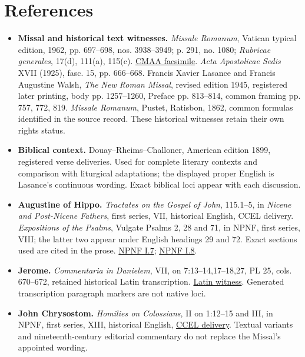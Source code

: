 \section{References}
\begin{itemize}[leftmargin=1.2em,itemsep=.55em]
\item \textbf{Missal and historical text witnesses.}
\emph{Missale Romanum}, Vatican typical edition, 1962, pp. 697--698, nos. 3938--3949; p. 291, no. 1080; \emph{Rubricae generales}, 17(d), 111(a), 115(c). \href{https://media.churchmusicassociation.org/pdf/missale62.pdf}{CMAA facsimile}. \emph{Acta Apostolicae Sedis} XVII (1925), fasc. 15, pp. 666--668. Francis Xavier Lasance and Francis Augustine Walsh, \emph{The New Roman Missal}, revised edition 1945, registered later printing, body pp. 1257--1260, Preface pp. 813--814, common framing pp. 757, 772, 819. \emph{Missale Romanum}, Pustet, Ratisbon, 1862, common formulas identified in the source record. These historical witnesses retain their own rights status.
\item \textbf{Biblical context.}
Douay--Rheims--Challoner, American edition 1899, registered verse deliveries. Used for complete literary contexts and comparison with liturgical adaptations; the displayed proper English is Lasance's continuous wording. Exact biblical loci appear with each discussion.
\item \textbf{Augustine of Hippo.}
\emph{Tractates on the Gospel of John}, 115.1--5, in \emph{Nicene and Post-Nicene Fathers}, first series, VII, historical English, CCEL delivery. \emph{Expositions of the Psalms}, Vulgate Psalms 2, 28 and 71, in NPNF, first series, VIII; the latter two appear under English headings 29 and 72. Exact sections used are cited in the prose. \href{https://www.ccel.org/ccel/schaff/npnf107.html}{NPNF I.7}; \href{https://www.ccel.org/ccel/schaff/npnf108.html}{NPNF I.8}.
\item \textbf{Jerome.}
\emph{Commentaria in Danielem}, VII, on 7:13--14,17--18,27, PL 25, cols. 670--672, retained historical Latin transcription. \href{https://la.wikisource.org/wiki/Commentaria_in_Danielem_(Hieronymus)}{Latin witness}. Generated transcription paragraph markers are not native loci.
\item \textbf{John Chrysostom.}
\emph{Homilies on Colossians}, II on 1:12--15 and III, in NPNF, first series, XIII, historical English, \href{https://www.ccel.org/ccel/schaff/npnf113.html}{CCEL delivery}. Textual variants and nineteenth-century editorial commentary do not replace the Missal's appointed wording.

\end{itemize}
